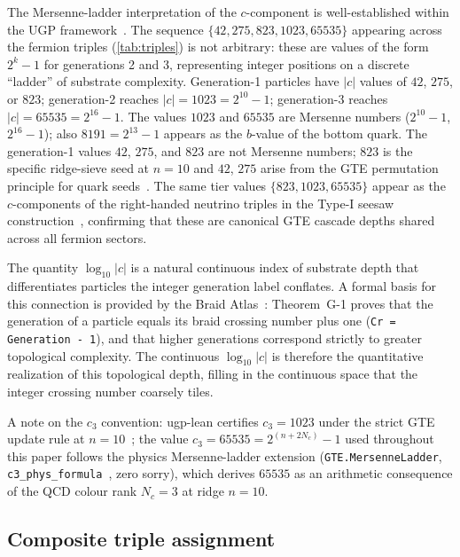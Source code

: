 \documentclass[12pt,a4paper]{article}
\begin{document}
The Mersenne-ladder interpretation of the $c$-component is well-established
within the UGP framework~\cite{Spivack2026_SM_UGP,SpivackBraidAtlas}.
The sequence $\{42, 275, 823, 1023, 65535\}$ appearing across the fermion
triples (\cref{tab:triples}) is not arbitrary: these are values of the form
$2^k - 1$ for generations 2 and 3, representing integer positions on a discrete
``ladder'' of substrate complexity.
Generation-1 particles have $|c|$ values of $42$, $275$, or $823$;
generation-2 reaches $|c| = 1023 = 2^{10}-1$;
generation-3 reaches $|c| = 65535 = 2^{16}-1$.
The values $1023$ and $65535$ are Mersenne numbers ($2^{10}-1$, $2^{16}-1$); also
$8191 = 2^{13}-1$ appears as the $b$-value of the bottom quark.
The generation-1 values $42$, $275$, and $823$ are not Mersenne numbers;
$823$ is the specific ridge-sieve seed at $n=10$ and $42$, $275$ arise from the
GTE permutation principle for quark seeds~\cite{Spivack2026_SM_UGP}.
The same tier values $\{823, 1023, 65535\}$ appear as the $c$-components of the
right-handed neutrino triples in the Type-I seesaw construction~\cite{SpivackNeutrino,Spivack2026_Koide},
confirming that these are canonical GTE cascade depths shared across all fermion sectors.

The quantity $\log_{10}|c|$ is a natural continuous index of substrate depth that
differentiates particles the integer generation label conflates.
A formal basis for this connection is provided by the Braid Atlas~\cite{SpivackBraidAtlas}:
Theorem~G-1 proves that the generation of a particle equals its braid
crossing number plus one (\texttt{Cr = Generation - 1}), and that higher
generations correspond strictly to greater topological complexity.
The continuous $\log_{10}|c|$ is therefore the quantitative realization
of this topological depth, filling in the continuous space that the
integer crossing number coarsely tiles.

A note on the $c_3$ convention: ugp-lean certifies $c_3 = 1023$ under
the strict GTE update rule at $n=10$~\cite{SpivackUnifiedRigidity}; the value
$c_3 = 65535 = 2^{(n+2N_c)}-1$ used throughout this paper follows the
physics Mersenne-ladder extension (\texttt{GTE.MersenneLadder},
\texttt{c3\_phys\_formula}~\cite{ugp-lean}, zero sorry), which derives $65535$
as an arithmetic consequence of the QCD colour rank $N_c = 3$
at ridge $n = 10$.

\subsection{Composite triple assignment}
\label{subsec:composite_assignment}
\end{document}
